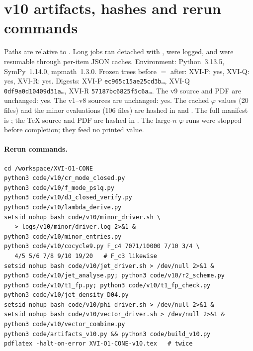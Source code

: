 
\section{v10 artifacts, hashes and rerun commands}
\label{app:v10artifacts}

Paths are relative to . Long jobs ran
detached with , were logged, and were resumable through
per-item JSON caches. Environment: Python~3.13.5, SymPy~1.14.0, mpmath~1.3.0.
Frozen trees before \(=\) after: XVI-P: yes, XVI-Q: yes, XVI-R: yes.
Digests: XVI-P \texttt{ec965c15ae25cd3b\ldots}, XVI-Q \texttt{0df9a0d10409d31a\ldots}, XVI-R \texttt{57187bc6825f5c6a\ldots}.
The v9 source and PDF are unchanged: yes. The v1--v8 sources are unchanged: yes.
The cached \(\varphi\) values (20 files) and the minor evaluations (106 files) are hashed in
 and . The full manifest is
; the \TeX{} source and PDF are hashed in .
The large-\(n\) \(\varphi\) runs were stopped before completion; they feed no printed value.

\paragraph{Rerun commands.}
\begin{verbatim}
cd /workspace/XVI-O1-CONE
python3 code/v10/cr_mode_closed.py
python3 code/v10/f_mode_pslq.py
python3 code/v10/dJ_closed_verify.py
python3 code/v10/lambda_derive.py
setsid nohup bash code/v10/minor_driver.sh \
   > logs/v10/minor/driver.log 2>&1 &
python3 code/v10/minor_entries.py
python3 code/v10/cocycle9.py F_c4 7071/10000 7/10 3/4 \
   4/5 5/6 7/8 9/10 19/20   # F_c3 likewise
setsid nohup bash code/v10/jet_driver.sh > /dev/null 2>&1 &
python3 code/v10/jet_analyse.py; python3 code/v10/r2_scheme.py
python3 code/v10/t1_fp.py; python3 code/v10/t1_fp_check.py
python3 code/v10/jet_density_D04.py
setsid nohup bash code/v10/phi_driver.sh > /dev/null 2>&1 &
setsid nohup bash code/v10/vector_driver.sh > /dev/null 2>&1 &
python3 code/v10/vector_combine.py
python3 code/artifacts_v10.py && python3 code/build_v10.py
pdflatex -halt-on-error XVI-O1-CONE-v10.tex   # twice
\end{verbatim}

